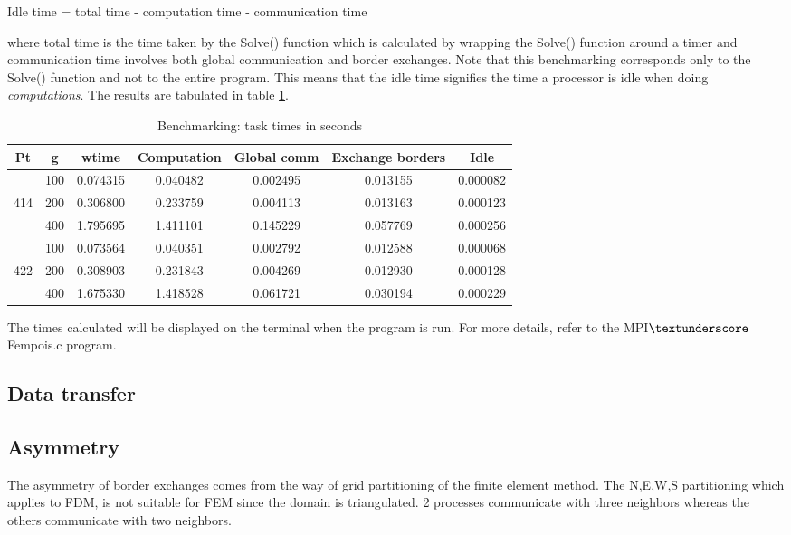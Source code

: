 \begin{center}
  Idle time = total time - computation time - communication time 
\end{center}

where total time is the time taken by the Solve() function which is calculated by wrapping the Solve() function around a timer and communication time involves both global communication and border exchanges. Note that this benchmarking corresponds only to the Solve() function and not to the entire program. This means that the idle time signifies the time a processor is idle when doing \textit{computations}. The results are tabulated in table \ref{42}. \\

\begin{table}[h!]
  \centering
  \begin{tabular}{|c|c|c|c|c|c|c|}
    \hline
    Pt & g & wtime & Computation & Global comm & Exchange borders & Idle \\
    \hline
       & 100 & 0.074315 & 0.040482 & 0.002495 & 0.013155 & 0.000082 \\
    414 & 200 & 0.306800 & 0.233759 & 0.004113 & 0.013163 & 0.000123 \\
       & 400 & 1.795695 & 1.411101 & 0.145229 & 0.057769 & 0.000256\\	
    \hline	
       & 100 & 0.073564 & 0.040351 & 0.002792 & 0.012588 & 0.000068 \\
    422 & 200 & 0.308903 & 0.231843 & 0.004269 & 0.012930 & 0.000128 \\
       & 400 & 1.675330 & 1.418528 & 0.061721 & 0.030194 & 0.000229 \\	
    \hline
  \end{tabular}
  \caption{Benchmarking: task times in seconds}
  \label{42}
\end{table}
              
The times calculated will be displayed on the terminal when the program is run. For more details, refer to the MPI$ \textunderscore $Fempois.c program. 

\subsection{Data transfer}

\subsection{Asymmetry}
The asymmetry of border exchanges comes from the way of grid partitioning of the finite element method. The N,E,W,S partitioning which applies to FDM, is not suitable for FEM since the domain is triangulated. 2 processes communicate with three neighbors whereas the others communicate with two neighbors. 


